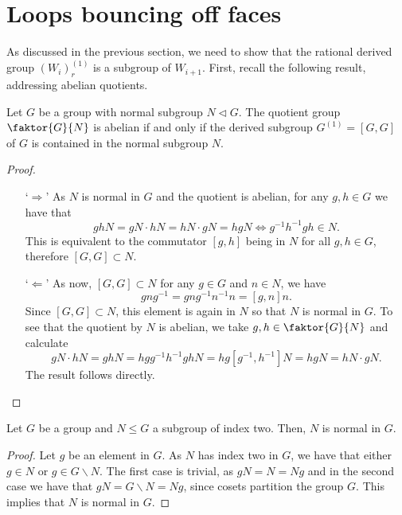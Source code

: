 

\section{Loops bouncing off faces}

As discussed in the previous section, we need to show that the rational derived group \((W_i)_r^{(1)}\) is a subgroup of \(W_{i+1}\).
First, recall the following result, addressing abelian quotients.

\begin{lemma}\label{lem:abelianquotient}
    Let \(G\) be a group with normal subgroup \(N \triangleleft G\).
    The quotient group \(\faktor{G}{N}\) is abelian if and only if the derived subgroup \(G^{(1)} = [G, G]\) of \(G\) is contained in the normal subgroup \(N\).
\end{lemma}
\begin{proof}
    \begin{itemize}
        \item[`\(\Rightarrow\)'] As \(N\) is normal in \(G\) and the quotient is abelian, for any \(g,h \in G\) we have that
            \[ghN = gN \cdot hN = hN \cdot gN = hgN \iff g^{-1}h^{-1}gh \in N.\]
            This is equivalent to the commutator \([g, h]\) being in \(N\) for all \(g,h \in G\), therefore \([G, G] \subset N\).
        
        \item[`\(\Leftarrow\)'] As now, \([G, G] \subset N\) for any \(g \in G\) and \(n \in N\), we have
            \[gng^{-1} = gng^{-1}n^{-1}n = [g, n]n.\]
            Since \([G, G] \subset N\), this element is again in \(N\) so that \(N\) is normal in \(G\).
            To see that the quotient by \(N\) is abelian, we take \(g, h \in \faktor{G}{N}\) and calculate
            \[gN \cdot hN = ghN = hgg^{-1}h^{-1}ghN = hg[g^{-1}, h^{-1}]N = hgN = hN \cdot gN.\]
            The result follows directly.
    \end{itemize}\vspace*{-2\parskip}
\end{proof}

\begin{lemma}\label{lem:indextwo}
    Let \(G\) be a group and \(N \leq G\) a subgroup of index two.
    Then, \(N\) is normal in \(G\).
\end{lemma}
\begin{proof}
    Let \(g\) be an element in \(G\).
    As \(N\) has index two in \(G\), we have that either \(g \in N\) or \(g \in G\backslash N\).
    The first case is trivial, as \(gN = N = Ng\) and in the second case we have that \(gN = G \backslash N = Ng\), since cosets partition the group \(G\).
    This implies that \(N\) is normal in \(G\).
\end{proof}

